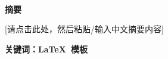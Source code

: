 \newpage
\clearpage
\cleardoublepage
\setcounter{page}{1}
\begin{center}
\vspace*{1.3mm}
\heiti\fontsize{16}{16}\textbf{\mytitle}\\
\vspace{11mm}
%

\fontsize{15}{15}
\textbf{摘}\hspace{5.3mm}\textbf{要}
\end{center}
\vspace{4.5mm}
\fontsize{14}{20}\selectfont
\noindent\phantom{空格}%
[请点击此处，然后粘贴/输入中文摘要内容]





\vspace{11.5mm}%

\noindent\phantom{空格}\heiti\textbf{%
	关键词：\LaTeX\ 模板
}
